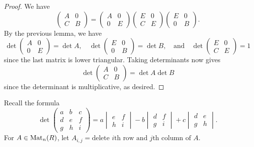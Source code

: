 \begin{proof}
  We have
  \[
    \begin{pmatrix}
      A & 0 \\
      C & B
    \end{pmatrix}
    =
    \begin{pmatrix}
      A & 0  \\
      0 & E
    \end{pmatrix}
    \begin{pmatrix}
      E & 0  \\
      C & E
    \end{pmatrix}
    \begin{pmatrix}
      E & 0  \\
      0 & B
    \end{pmatrix}.
  \]
  By the previous lemma, we have
  \[
    \det
    \begin{pmatrix}
      A & 0 \\
      0 & E
    \end{pmatrix} = \det A,
    \quad
    \det
    \begin{pmatrix}
      E & 0 \\
      0 & B
    \end{pmatrix} = \det B,
    \quad \text{and} \quad
    \det
    \begin{pmatrix}
      E & 0 \\
      C & E
    \end{pmatrix} = 1
  \]
  since the last matrix is lower triangular. Taking
  determinants now gives
  \[
    \det
    \begin{pmatrix}
      A & 0 \\
      C & B
    \end{pmatrix}
    = \det A \det B
  \]
  since the determinant is multiplicative, as desired.
\end{proof}

\begin{remark}
  Recall the formula
  \[
    \det
    \begin{pmatrix}
      a & b & c \\
      d & e & f \\
      g & h & i
    \end{pmatrix}
    = a
    \begin{vmatrix}
      e & f \\
      h & i
    \end{vmatrix}
    - b
    \begin{vmatrix}
      d & f \\
      g & i
    \end{vmatrix}
    + c
    \begin{vmatrix}
      d & e \\
      g & h
    \end{vmatrix}.
  \]
  For $A \in \operatorname{Mat}_n(R)$, let
  $A_{i, j} = \text{delete $i$th row and $j$th column of $A$}$.
\end{remark}

